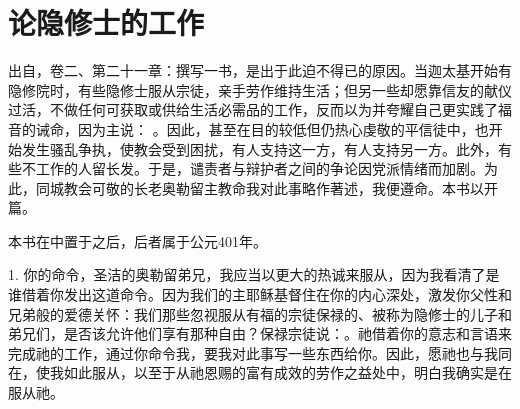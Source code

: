 
\chapter{论隐修士的工作}


出自，卷二、第二十一章：撰写一书，是出于此迫不得已的原因。当迦太基开始有隐修院时，有些隐修士服从宗徒，亲手劳作维持生活；但另一些却愿靠信友的献仪过活，不做任何可获取或供给生活必需品的工作，反而以为并夸耀自己更实践了福音的诫命，因为主说： 。因此，甚至在目的较低但仍热心虔敬的平信徒中，也开始发生骚乱争执，使教会受到困扰，有人支持这一方，有人支持另一方。此外，有些不工作的人留长发。于是，谴责者与辩护者之间的争论因党派情绪而加剧。为此，同城教会可敬的长老奥勒留主教命我对此事略作著述，我便遵命。本书以开篇。\par

本书在中置于之后，后者属于公元401年。\par

1. 你的命令，圣洁的奥勒留弟兄，我应当以更大的热诚来服从，因为我看清了是谁借着你发出这道命令。因为我们的主耶稣基督住在你的内心深处，激发你父性和兄弟般的爱德关怀：我们那些忽视服从有福的宗徒保禄的、被称为隐修士的儿子和弟兄们，是否该允许他们享有那种自由？保禄宗徒说：。祂借着你的意志和言语来完成祂的工作，通过你命令我，要我对此事写一些东西给你。因此，愿祂也与我同在，使我如此服从，以至于从祂恩赐的富有成效的劳作之益处中，明白我确实是在服从祂。\par

